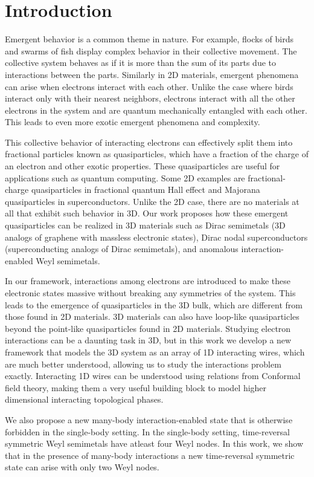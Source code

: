 \chapter{Introduction}\label{chap:Introduction}
Emergent behavior is a common theme in nature. For example, flocks of birds and swarms of fish display complex behavior in their collective movement. The collective system behaves as if it is more than the sum of its parts due to interactions between the parts. Similarly in 2D materials, emergent phenomena can arise when electrons interact with each other. Unlike the case where birds interact only with their nearest neighbors, electrons interact with all the other electrons in the system and are quantum mechanically entangled with each other. This leads to even more exotic emergent phenomena and complexity. 

This collective behavior of interacting electrons can effectively split them into fractional particles known as quasiparticles, which have a fraction of the charge of an electron and other exotic properties. These quasiparticles are useful for applications such as quantum computing. Some 2D examples are fractional-charge quasiparticles in fractional quantum Hall effect and Majorana quasiparticles in superconductors. Unlike the 2D case, there are no materials at all that exhibit such behavior in 3D. Our work proposes how these emergent quasiparticles can be realized in 3D materials such as Dirac semimetals (3D analogs of graphene with massless electronic states), Dirac nodal superconductors (superconducting analogs of Dirac semimetals), and anomalous interaction-enabled Weyl semimetals.

In our framework, interactions among electrons are introduced to make these electronic states massive without breaking any symmetries of the system. This leads to the emergence of quasiparticles in the 3D bulk, which are different from those found in 2D materials. 3D materials can also have loop-like quasiparticles beyond the point-like quasiparticles found in 2D materials. Studying electron interactions can be a daunting task in 3D, but in this work we develop a new framework that models the 3D system as an array of 1D interacting wires, which are much better understood, allowing us to study the interactions problem exactly. Interacting 1D wires can be understood using relations from Conformal field theory, making them a very useful building block to model higher dimensional interacting topological phases.

We also propose a new many-body interaction-enabled state that is otherwise forbidden in the single-body setting. In the single-body setting, time-reversal symmetric Weyl semimetals have atleast four Weyl nodes. In this work, we show that in the presence of many-body interactions a new time-reversal symmetric state can arise with only two Weyl nodes. 


